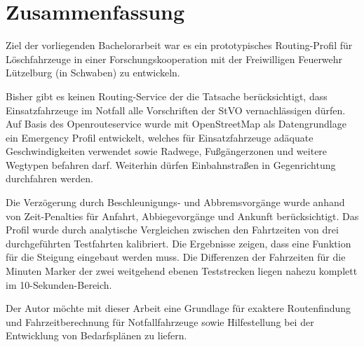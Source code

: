 {\centering\section*{Zusammenfassung}}

\vspace{1cm}

Ziel der vorliegenden Bachelorarbeit war es ein prototypisches Routing-Profil für Löschfahrzeuge in einer Forschungskooperation mit der Freiwilligen Feuerwehr Lützelburg (in Schwaben) zu entwickeln.
\medskip

Bisher gibt es keinen Routing-Service der die Tatsache berücksichtigt, dass Einsatzfahrzeuge im Notfall alle Vorschriften der StVO vernachlässigen dürfen.
Auf Basis des Openrouteservice wurde mit OpenStreetMap als Datengrundlage ein Emergency Profil entwickelt, welches für Einsatzfahrzeuge adäquate Geschwindigkeiten verwendet sowie Radwege, Fußgängerzonen und weitere Wegtypen befahren darf. Weiterhin dürfen Einbahnstraßen in Gegenrichtung durchfahren werden.\par
Die Verzögerung durch Beschleunigungs- und Abbremsvorgänge wurde anhand von Zeit-Penalties für Anfahrt, Abbiegevorgänge und Ankunft berücksichtigt.
Das Profil wurde durch analytische Vergleichen zwischen den Fahrtzeiten von drei durchgeführten Testfahrten kalibriert. Die Ergebnisse zeigen, dass eine Funktion für die Steigung eingebaut werden muss.
Die Differenzen der Fahrzeiten für die Minuten Marker der zwei weitgehend ebenen Teststrecken liegen nahezu komplett im 10-Sekunden-Bereich.
\bigskip

Der Autor möchte mit dieser Arbeit eine Grundlage für exaktere Routenfindung und Fahrzeitberechnung für Notfallfahrzeuge sowie Hilfestellung bei der Entwicklung von Bedarfsplänen zu liefern.
